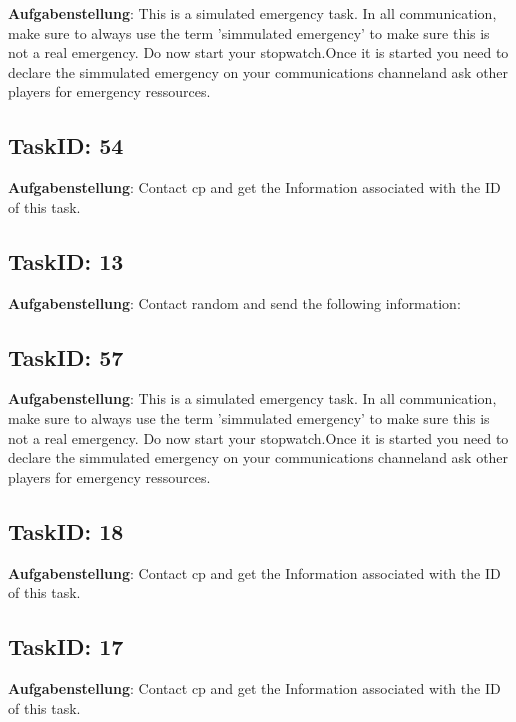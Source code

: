 \documentclass[12pt,a4paper]{scrreprt}
\begin{document}
\textbf{Aufgabenstellung}: This is a simulated emergency task. In all communication, make sure to always use the term 'simmulated emergency' to make sure this is not a real emergency. Do now start your stopwatch.Once it is started you need to declare the simmulated emergency on your communications channeland ask other players for emergency ressources.\subsection{TaskID: 54}
\textbf{Aufgabenstellung}: Contact {cp} and get the Information associated with the ID of this task.\subsection{TaskID: 13}
\textbf{Aufgabenstellung}: Contact random and send the following information: \subsection{TaskID: 57}
\textbf{Aufgabenstellung}: This is a simulated emergency task. In all communication, make sure to always use the term 'simmulated emergency' to make sure this is not a real emergency. Do now start your stopwatch.Once it is started you need to declare the simmulated emergency on your communications channeland ask other players for emergency ressources.\subsection{TaskID: 18}
\textbf{Aufgabenstellung}: Contact {cp} and get the Information associated with the ID of this task.\subsection{TaskID: 17}
\textbf{Aufgabenstellung}: Contact {cp} and get the Information associated with the ID of this task.
\end{document}
